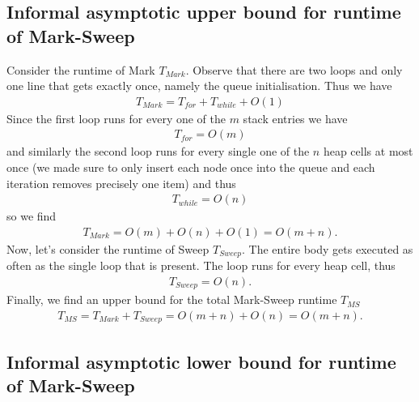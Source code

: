 \documentclass{article}
\begin{document}
\subsection{Informal asymptotic upper bound for runtime of Mark-Sweep}

Consider the runtime of Mark $T_{Mark}$. Observe that there are two loops
and only one line that gets exactly once, namely the queue initialisation.
Thus we have
\begin{align*}
    T_{Mark} = T_{for} + T_{while} + O(1)
\end{align*}
Since the first loop runs for every one of the $m$ stack entries we have
\begin{align*}
    T_{for} = O(m)
\end{align*}
and similarly the second loop runs for every single one of the $n$ heap cells at most once
(we made sure to only insert each node once into the queue and each iteration
removes precisely one item) and thus
\begin{align*}
    T_{while} = O(n)
\end{align*}
so we find 
\begin{align*}
    T_{Mark} = O(m) + O(n) + O(1) = O(m + n).
\end{align*}
Now, let's consider the runtime of Sweep $T_{Sweep}$. The entire body gets
executed as often as the single loop that is present. The loop runs for every
heap cell, thus 
\begin{align*}
    T_{Sweep} = O(n).
\end{align*}
Finally, we find an upper bound for the total Mark-Sweep runtime $T_{MS}$
\begin{align}
    \label{infhims}
    T_{MS} = T_{Mark} + T_{Sweep} = O(m+n) + O(n) = O(m + n).
\end{align}

\subsection{Informal asymptotic lower bound for runtime of Mark-Sweep}
\end{document}
